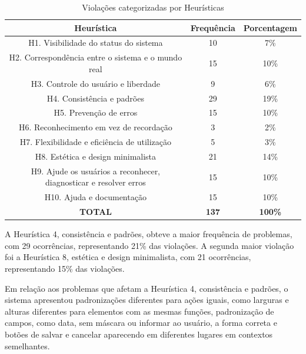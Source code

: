 \begin{table}[H]
\centering
\caption{ Violações categorizadas por Heurísticas}
\label{tab:heuristicasAfetadas}
\begin{tabular}{c|c|c}
      \hline
      \rowcolor[gray]{.9}
 \bf Heurística   &  \bf Frequência & \bf Porcentagem  \\
      \hline
      \hline
H1. Visibilidade do status do sistema
& 10  & 7\%\\

H2. Correspondência entre o sistema e o mundo real 
& 15 & 10\% \\  

H3. Controle do usuário e liberdade                     
& 9  & 6\%     \\

H4. Consistência e padrões                          
& 29  & 19\%      \\

H5. Prevenção de erros                        
&15  & 10\%      \\

H6. Reconhecimento em vez de recordação                 
&3  &2\%      \\

H7. Flexibilidade e eficiência de utilização           
&5  &3\%      \\

H8. Estética e design minimalista                       
& 21  & 14\%      \\

H9. Ajude os usuários a reconhecer, diagnosticar e resolver erros                
& 15  &10\%      \\

H10. Ajuda e documentação                       
&15  &10\%      \\


\hline
\hline
\bf TOTAL   & \bf 137        & \bf 100\%   \\
 \hline 
\end{tabular}
\end{table}

A Heurística 4, consistência e padrões, obteve a maior frequência de problemas, com 29 ocorrências, representando 21\% das violações. A segunda maior violação foi a Heurística 8, estética e design minimalista, com 21 ocorrências, representando 15\% das violações. 

Em relação aos problemas que afetam a Heurística 4, consistência e padrões, o sistema apresentou padronizações diferentes para ações iguais, como larguras e alturas diferentes para elementos com as mesmas funções, padronização de campos, como data, sem máscara ou informar ao usuário, a forma correta e botões de salvar e cancelar aparecendo em diferentes lugares em contextos semelhantes.

